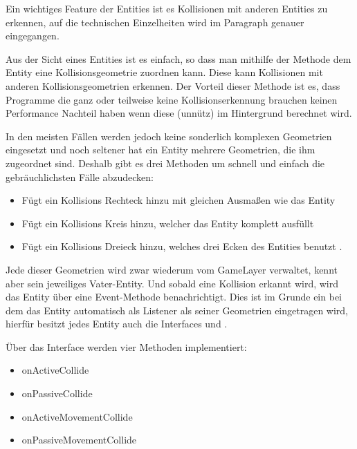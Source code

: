 Ein wichtiges Feature der Entities ist es Kollisionen mit anderen Entities zu erkennen, auf die technischen Einzelheiten wird im Paragraph  genauer eingegangen.

Aus der Sicht eines Entities ist es einfach, so dass man mithilfe der Methode  dem Entity eine Kollisionsgeometrie zuordnen kann. Diese kann Kollisionen mit anderen Kollisionsgeometrien erkennen.
Der Vorteil dieser Methode ist es, dass Programme die ganz oder teilweise keine Kollisionserkennung brauchen keinen Performance Nachteil haben wenn diese (unnütz) im Hintergrund berechnet wird.

In den meisten Fällen werden jedoch keine sonderlich komplexen Geometrien eingesetzt und noch seltener hat ein Entity mehrere Geometrien, die ihm zugeordnet sind.
Deshalb gibt es drei Methoden um schnell und einfach die gebräuchlichsten Fälle abzudecken:

\begin{itemize}
	\item {} Fügt ein Kollisions Rechteck hinzu mit gleichen Ausmaßen wie das Entity
	\item {} Fügt ein Kollisions Kreis hinzu, welcher das Entity komplett ausfüllt
	\item {} Fügt ein Kollisions Dreieck hinzu, welches drei Ecken des Entities benutzt .
\end{itemize}

Jede dieser Geometrien wird zwar wiederum vom GameLayer verwaltet, kennt aber sein jeweiliges Vater-Entity. Und sobald eine Kollision erkannt wird, wird das Entity über eine Event-Methode benachrichtigt. Dies ist im Grunde ein  bei dem das Entity automatisch als Listener als seiner Geometrien eingetragen wird, hierfür besitzt jedes Entity auch die Interfaces  und .

Über das Interface  werden vier Methoden implementiert:

\begin{itemize}
	\item onActiveCollide
	\item onPassiveCollide
	\item onActiveMovementCollide
	\item onPassiveMovementCollide
\end{itemize}

